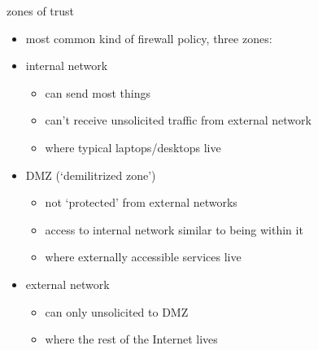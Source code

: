 \begin{frame}{zones of trust}
    \begin{itemize}
    \item most common kind of firewall policy, three zones:
    \item internal network
        \begin{itemize}
        \item can send most things
        \item can't receive unsolicited traffic from external network
        \item where typical laptops/desktops live
        \end{itemize}
    \item DMZ (`demilitrized zone')
        \begin{itemize}
        \item not `protected' from external networks
        \item access to internal network similar to being within it
        \item where externally accessible services live
        \end{itemize}
    \item external network
        \begin{itemize}
        \item can only unsolicited to DMZ
        \item where the rest of the Internet lives
        \end{itemize}
    \end{itemize}
\end{frame}
